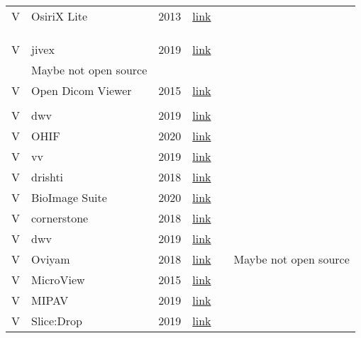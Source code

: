 \documentclass{article}
\begin{document}
\begin{longtable}{|l|l|l|l|l|l|}
V & OsiriX Lite & 2013 & \href{https://github.com/pixmeo/osirix}{link} & \begin{tabular}[c]{@{}l@{}}\citep{Bjorn2017}\\ \citep{Bruhschwein2019}\\ \\ \citep{Haak2015}\end{tabular} &  \\ \hline
V & jivex & 2019 & \href{https://www.visus.com/en/downloads/jivex-dicom-viewer.html}{link} & \begin{tabular}[c]{@{}l@{}}\citep{Mu2019}\\ \citep{Haak2015}\end{tabular} & Maybe not open source \\ \hline
V & Open Dicom Viewer & 2015 & \href{https://sourceforge.net/projects/opendicomviewer/}{link} & \begin{tabular}[c]{@{}l@{}}\citep{Mu2019}\\ \citep{Haak2015}\end{tabular} &  \\ \hline
V & dwv & 2019 & \href{https://ivmartel.github.io/dwv/}{link} & \citep{Bjorn2017} &  \\ \hline
V & OHIF & 2020 & \href{http://ohif.org/}{link} & \citep{Bjorn2017} &  \\ \hline
V & vv & 2019 & \href{https://github.com/open-vv/vv}{link} & \citep{Bjorn2017} &  \\ \hline
V & drishti & 2018 & \href{https://github.com/nci/drishti}{link} & \citep{Bjorn2017} &  \\ \hline
V & BioImage Suite & 2020 & \href{https://bioimagesuiteweb.github.io/webapp/}{link} & \citep{Haak2015} &  \\ \hline
V & cornerstone & 2018 & \href{https://github.com/cornerstonejs/cornerstone/releases}{link} & \citep{Haak2015} &  \\ \hline
V & dwv & 2019 & \href{https://ivmartel.github.io/dwv/}{link} & \citep{Haak2015} &  \\ \hline
V & Oviyam & 2018 & \href{http://oviyam.raster.in/index.html}{link} & \citep{Haak2015} & Maybe not open source \\ \hline
V & MicroView & 2015 & \href{http://microview.sourceforge.net/}{link} & \citep{Haak2015} &  \\ \hline
V & MIPAV & 2019 & \href{https://mipav.cit.nih.gov/}{link} & \citep{Haak2015} &  \\ \hline
V & Slice:Drop & 2019 & \href{https://github.com/slicedrop/slicedrop.github.com}{link} & \citep{Haak2015} &  \\ \hline

\end{longtable}
\end{document}
